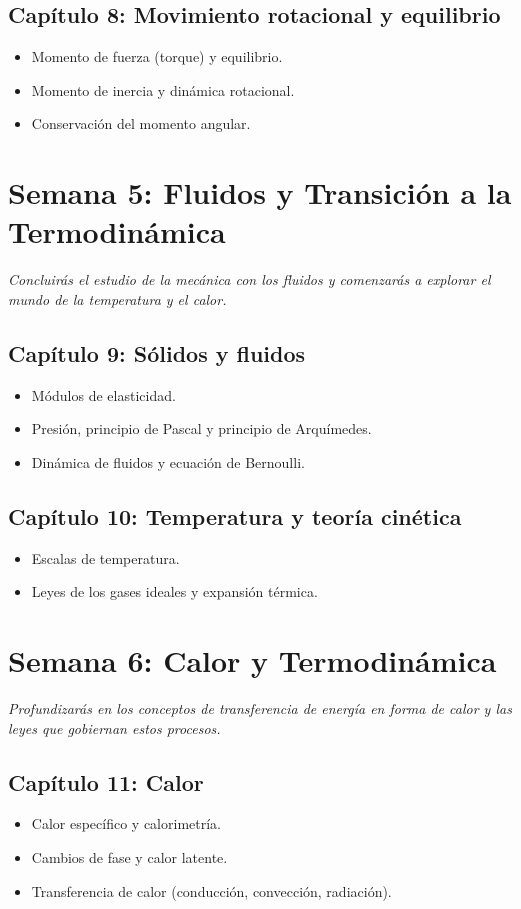 \documentclass[12pt, a4paper]{article}
\begin{document}
\subsection*{Capítulo 8: Movimiento rotacional y equilibrio}
\begin{itemize}[leftmargin=*]
    \item Momento de fuerza (torque) y equilibrio.
    \item Momento de inercia y dinámica rotacional.
    \item Conservación del momento angular.
\end{itemize}

\newpage

\section*{Semana 5: Fluidos y Transición a la Termodinámica}
\textit{Concluirás el estudio de la mecánica con los fluidos y comenzarás a explorar el mundo de la temperatura y el calor.}
\subsection*{Capítulo 9: Sólidos y fluidos}
\begin{itemize}[leftmargin=*]
    \item Módulos de elasticidad.
    \item Presión, principio de Pascal y principio de Arquímedes.
    \item Dinámica de fluidos y ecuación de Bernoulli.
\end{itemize}
\subsection*{Capítulo 10: Temperatura y teoría cinética}
\begin{itemize}[leftmargin=*]
    \item Escalas de temperatura.
    \item Leyes de los gases ideales y expansión térmica.
\end{itemize}

\section*{Semana 6: Calor y Termodinámica}
\textit{Profundizarás en los conceptos de transferencia de energía en forma de calor y las leyes que gobiernan estos procesos.}
\subsection*{Capítulo 11: Calor}
\begin{itemize}[leftmargin=*]
    \item Calor específico y calorimetría.
    \item Cambios de fase y calor latente.
    \item Transferencia de calor (conducción, convección, radiación).
\end{itemize}
\end{document}
